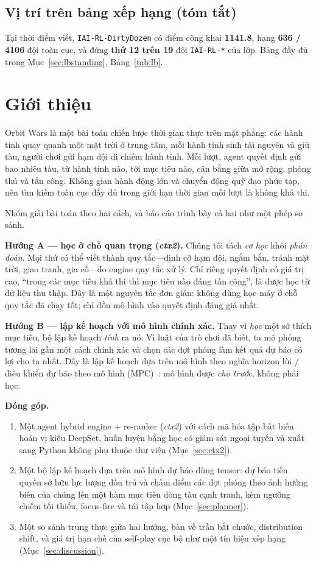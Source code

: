 \documentclass[conference]{IEEEtran}
\begin{document}
\subsection{Vị trí trên bảng xếp hạng (tóm tắt)}
Tại thời điểm viết, \texttt{IAI-RL-DirtyDozen} có điểm công khai \textbf{1141.8}, hạng \textbf{636 / 4106} đội toàn cục, và đứng \textbf{thứ 12 trên 19} đội \texttt{IAI-RL-*} của lớp. Bảng đầy đủ trong Mục~\ref{sec:lbstanding}, Bảng~\ref{tab:lb}.

\section{Giới thiệu}

Orbit Wars là một bài toán chiến lược thời gian thực trên mặt phẳng: các hành tinh quay quanh một mặt trời ở trung tâm, mỗi hành tinh sinh tài nguyên và giữ tàu, người chơi gửi hạm đội đi chiếm hành tinh. Mỗi lượt, agent quyết định gửi bao nhiêu tàu, từ hành tinh nào, tới mục tiêu nào, cân bằng giữa mở rộng, phòng thủ và tấn công. Không gian hành động lớn và chuyển động quỹ đạo phức tạp, nên tìm kiếm toàn cục đầy đủ trong giới hạn thời gian mỗi lượt là không khả thi.

Nhóm giải bài toán theo hai cách, và báo cáo trình bày cả hai như một phép so sánh.

\textbf{Hướng A --- học ở chỗ quan trọng (\textit{ctx2}).} Chúng tôi tách \emph{cơ học} khỏi \emph{phán đoán}. Mọi thứ có thể viết thành quy tắc---định cỡ hạm đội, ngắm bắn, tránh mặt trời, giao tranh, gia cố---do engine quy tắc xử lý. Chỉ riêng quyết định có giá trị cao, ``trong các mục tiêu khả thi thì mục tiêu nào đáng tấn công'', là được học từ dữ liệu thu thập. Đây là một nguyên tắc đơn giản: không dùng học máy ở chỗ quy tắc đã chạy tốt; chỉ dồn mô hình vào quyết định đáng giá nhất.

\textbf{Hướng B --- lập kế hoạch với mô hình chính xác.} Thay vì \emph{học} một sở thích mục tiêu, bộ lập kế hoạch \emph{tính} ra nó. Vì luật của trò chơi đã biết, ta mô phỏng tương lai gần một cách chính xác và chọn các đợt phóng làm kết quả dự báo có lợi cho ta nhất. Đây là lập kế hoạch dựa trên mô hình theo nghĩa horizon lùi / điều khiển dự báo theo mô hình (MPC)~\cite{mpc1989, suttonbarto}: mô hình được \emph{cho trước}, không phải học.

\textbf{Đóng góp.}
\begin{enumerate}
\item Một agent hybrid engine + re-ranker (\textit{ctx2}) với cách mã hóa tập bất biến hoán vị kiểu DeepSet, huấn luyện bằng học có giám sát ngoại tuyến và xuất sang Python không phụ thuộc thư viện (Mục~\ref{sec:ctx2}).
\item Một bộ lập kế hoạch dựa trên mô hình dự báo dùng tensor: dự báo tiến quyền sở hữu lực lượng đồn trú và chấm điểm các đợt phóng theo ảnh hưởng biên của chúng lên một hàm mục tiêu dòng tàu cạnh tranh, kèm ngưỡng chiếm tối thiểu, focus-fire và tái tập hợp (Mục~\ref{sec:planner}).
\item Một so sánh trung thực giữa hai hướng, bàn về trần bắt chước, distribution shift, và giá trị hạn chế của self-play cục bộ như một tín hiệu xếp hạng (Mục~\ref{sec:discussion}).
\end{enumerate}
\end{document}
